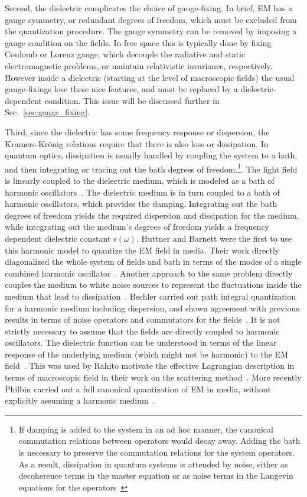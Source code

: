Second, the dielectric complicates the choice of gauge-fixing.  
In brief, EM has a gauge symmetry, or redundant degrees of freedom, which must be 
excluded from the quantization procedure.  
The gauge symmetry can be removed by imposing a gauge condition on the fields.
  In free space this is typically done by fixing Coulomb or Lorenz gauge, which 
decouple the radiative and static electromagnetic problems, or maintain relativistic invariance, respectively.
However inside a dielectric (starting at the level of macroscopic fields) the usual gauge-fixings lose these nice
features, and must be replaced by a dielectric-dependent condition.  
This issue will be discussed further in Sec.~\ref{sec:gauge_fixing}.

Third, since the dielectric has some frequency response or dispersion, the Kramers-Kr\"onig relations 
require that there is also loss or dissipation.  
In  quantum optics, dissipation is usually handled by coupling the system to a bath, and then
integrating or tracing out the bath degrees of freedom.\footnote{If damping is added to the system in an ad hoc
manner, the canonical commutation relations between operators would decay away.  Adding the bath
is necessary to preserve the commutation relations for the system operators.  As a result, dissipation in quantum systems 
is attended by noise, either as decoherence terms in the master equation or as noise terms in the Langevin equations for the operators~\cite{GardinerZoller2004}}.
The light field is linearly coupled to the dielectric medium, which is modeled
as a bath of harmonic oscillators~\cite{Huttner1992,Dung1998,Bechler1999}.
The dielectric medium is in turn coupled to a bath of harmonic oscillators, which provides the damping.
Integrating out the bath degrees of freedom yields the required dispersion and dissipation for the medium, 
while integrating out the medium's degrees of freedom yields a frequency dependent dielectric constant $\epsilon(\omega)$.
Huttner and Barnett were the first to use this harmonic model to quantize the EM field in media. Their
work directly diagonalized the whole system of fields and bath in terms of the modes of 
a single combined harmonic oscillator~\cite{Huttner1992}.
Another approach to the same problem directly couples the medium to white noise sources to represent the fluctuations 
inside the medium that lead to dissipation~\cite{Scheel1998,Dung1998,Tip2001}.
Bechler carried out path integral quantization for a harmonic medium 
including dispersion, and shown agreement with previous results in terms 
of noise operators and commutators for the fields~\cite{Bechler1999,Bechler2006}.  
It is not strictly necessary to assume that the fields are directly coupled to harmonic oscillators. 
The dielectric function can be understood in terms of the linear response of the underlying 
medium (which might not be harmonic) to the EM field~\cite{Altland2011}.  
This was used by Rahi\etal to motivate the effective Lagrangian description in terms of macroscopic field in their 
work on the scattering method~\cite{Rahi2009}.  
More recently Philbin carried out a full canonical quantization of EM in media, without explicitly 
assuming a harmonic medium~\cite{Philbin2010}.


